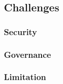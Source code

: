 \subsection{Challenges}

\subsubsection{Security}
\subsubsection{Governance}
\subsubsection{Limitation}